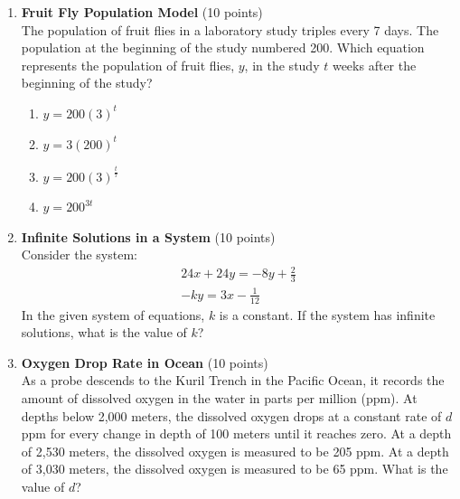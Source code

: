 \begin{enumerate}
  \item \textbf{Fruit Fly Population Model} (10 points)\\
  The population of fruit flies in a laboratory study triples every 7 days. The population at the beginning of the study numbered 200. Which equation represents the population of fruit flies, $y$, in the study $t$ weeks after the beginning of the study?
  \begin{enumerate}[label=(\Alph*)]
    \item $y = 200(3)^t$
    \item $y = 3(200)^t$
    \item $y = 200(3)^{\frac{t}{7}}$
    \item $y = 200^{3t}$
  \end{enumerate}
  \begin{subanswer}
  \end{subanswer}



  \item \textbf{Infinite Solutions in a System} (10 points)\\
  Consider the system:
  $$
  \begin{gathered}
  24 x+24 y=-8 y+\frac{2}{3} \\
  -k y=3 x-\frac{1}{12}
  \end{gathered}
  $$
  In the given system of equations, $k$ is a constant. If the system has infinite solutions, what is the value of $k$?
  \begin{subanswer}
  \end{subanswer}



  \item \textbf{Oxygen Drop Rate in Ocean} (10 points)\\
  As a probe descends to the Kuril Trench in the Pacific Ocean, it records the amount of dissolved oxygen in the water in parts per million (ppm). At depths below 2,000 meters, the dissolved oxygen drops at a constant rate of $d$ ppm for every change in depth of 100 meters until it reaches zero. At a depth of 2,530 meters, the dissolved oxygen is measured to be 205 ppm. At a depth of 3,030 meters, the dissolved oxygen is measured to be 65 ppm. What is the value of $d$?
  \begin{subanswer}
  \end{subanswer}




\end{enumerate}
